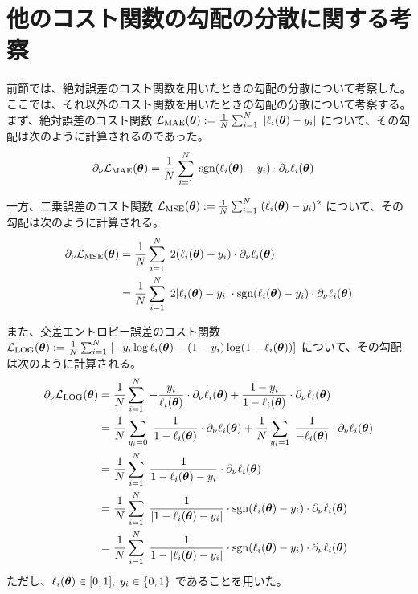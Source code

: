 \section{他のコスト関数の勾配の分散に関する考察}\label{sec:cost2}
前節では、絶対誤差のコスト関数を用いたときの勾配の分散について考察した。ここでは、それ以外のコスト関数を用いたときの勾配の分散について考察する。まず、絶対誤差のコスト関数 $\mathcal{L}_{\mathrm{MAE}}(\boldsymbol{\theta}) := \frac1N\sum_{i=1}^N \;|\ell_i(\boldsymbol{\theta}) - y_i|$ について、その勾配は次のように計算されるのであった。
\begin{align}
    \partial_\nu\mathcal{L}_{\mathrm{MAE}}(\boldsymbol{\theta})
    &= \frac1N\sum_{i=1}^N \;\operatorname{sgn}(\ell_i(\boldsymbol{\theta}) - y_i) \cdot \partial_\nu\ell_i(\boldsymbol{\theta})
\end{align}

一方、二乗誤差のコスト関数 $\mathcal{L}_{\mathrm{MSE}}(\boldsymbol{\theta}) := \frac1N\sum_{i=1}^N \;(\ell_i(\boldsymbol{\theta}) - y_i)^2$ について、その勾配は次のように計算される。
\begin{align}
    \partial_\nu\mathcal{L}_{\mathrm{MSE}}(\boldsymbol{\theta})
    &= \frac1N\sum_{i=1}^N \;2(\ell_i(\boldsymbol{\theta}) - y_i) \cdot \partial_\nu\ell_i(\boldsymbol{\theta}) \nonumber\\
    &= \frac1N\sum_{i=1}^N \;2\abs{\ell_i(\boldsymbol{\theta}) - y_i} \cdot \operatorname{sgn}(\ell_i(\boldsymbol{\theta}) - y_i) \cdot \partial_\nu\ell_i(\boldsymbol{\theta})\label{eq:mse-cost-grad}
\end{align}

また、交差エントロピー誤差のコスト関数 $\mathcal{L}_{\mathrm{LOG}}(\boldsymbol{\theta}) := \frac1N\sum_{i=1}^N \; [- y_i \log\ell_i(\boldsymbol{\theta}) - (1-y_i)\log(1-\ell_i(\boldsymbol{\theta}))]$ について、その勾配は次のように計算される。
\begin{align}
    \partial_\nu\mathcal{L}_{\mathrm{LOG}}(\boldsymbol{\theta})
    &= \frac1N\sum_{i=1}^N \; - \frac{y_i}{\ell_i(\boldsymbol{\theta})} \cdot \partial_\nu\ell_i(\boldsymbol{\theta}) + \frac{1-y_i}{1-\ell_i(\boldsymbol{\theta})} \cdot \partial_\nu\ell_i(\boldsymbol{\theta})\nonumber\\
    &= \frac1N\sum_{y_i=0} \; \frac{1}{1-\ell_i(\boldsymbol{\theta})} \cdot \partial_\nu\ell_i(\boldsymbol{\theta}) + \frac1N\sum_{y_i=1} \; \frac{1}{-\ell_i(\boldsymbol{\theta})} \cdot \partial_\nu\ell_i(\boldsymbol{\theta})\nonumber\\
    &= \frac1N\sum_{i=1}^N \; \frac{1}{1-\ell_i(\boldsymbol{\theta})-y_i} \cdot \partial_\nu\ell_i(\boldsymbol{\theta})\nonumber\\
    &= \frac1N\sum_{i=1}^N \; \frac{1}{|1-\ell_i(\boldsymbol{\theta})-y_i|} \cdot\operatorname{sgn}(\ell_i(\boldsymbol{\theta})-y_i)\cdot \partial_\nu\ell_i(\boldsymbol{\theta})\nonumber\\
    &= \frac1N\sum_{i=1}^N \; \frac{1}{1-|\ell_i(\boldsymbol{\theta})-y_i|} \cdot\operatorname{sgn}(\ell_i(\boldsymbol{\theta})-y_i)\cdot \partial_\nu\ell_i(\boldsymbol{\theta})\label{eq:log-cost-grad}
\end{align}
ただし、$\ell_i(\boldsymbol{\theta}) \in [0,1],\;y_i \in \{0,1\}$ であることを用いた。


